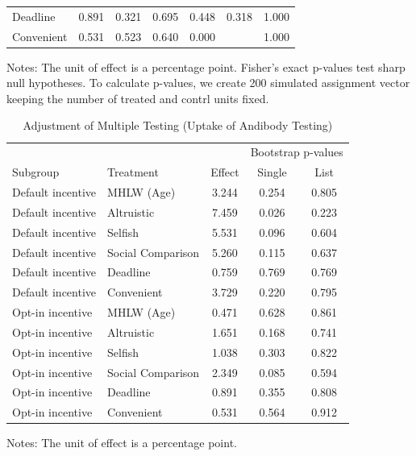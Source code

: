 \documentclass[
    a4paper
]{article}
\begin{document}
\begin{table}
\begin{threeparttable}
\begin{tabular}[t]{lcccccc}
\hspace{1em}Deadline & 0.891 & 0.321 & 0.695 & 0.448 & 0.318 & 1.000\\
\hspace{1em}Convenient & 0.531 & 0.523 & 0.640 & 0.000 &  & 1.000\\
\bottomrule
\end{tabular}
\begin{tablenotes}
\item Notes: The unit of effect is a percentage point. Fisher's exact p-values test sharp null hypotheses. To calculate p-values, we create 200 simulated assignment vector keeping the number of treated and contrl units fixed.
\end{tablenotes}
\end{threeparttable}
\end{table}

\begin{table}

\caption{\label{tab:multiple-adjust-test-act}Adjustment of Multiple Testing (Uptake of Andibody Testing)}
\centering
\fontsize{9}{11}\selectfont
\begin{threeparttable}
\begin{tabular}[t]{llccc}
\toprule
\multicolumn{3}{c}{ } & \multicolumn{2}{c}{Bootstrap p-values} \\
\cmidrule(l{3pt}r{3pt}){4-5}
Subgroup & Treatment & Effect & Single & List\\
\midrule
Default incentive & MHLW (Age) & 3.244 & 0.254 & 0.805\\
Default incentive & Altruistic & 7.459 & 0.026 & 0.223\\
Default incentive & Selfish & 5.531 & 0.096 & 0.604\\
Default incentive & Social Comparison & 5.260 & 0.115 & 0.637\\
Default incentive & Deadline & 0.759 & 0.769 & 0.769\\
Default incentive & Convenient & 3.729 & 0.220 & 0.795\\
Opt-in incentive & MHLW (Age) & 0.471 & 0.628 & 0.861\\
Opt-in incentive & Altruistic & 1.651 & 0.168 & 0.741\\
Opt-in incentive & Selfish & 1.038 & 0.303 & 0.822\\
Opt-in incentive & Social Comparison & 2.349 & 0.085 & 0.594\\
Opt-in incentive & Deadline & 0.891 & 0.355 & 0.808\\
Opt-in incentive & Convenient & 0.531 & 0.564 & 0.912\\
\bottomrule
\end{tabular}
\begin{tablenotes}
\item Notes: The unit of effect is a percentage point.
\end{tablenotes}
\end{threeparttable}
\end{table}
\end{document}
